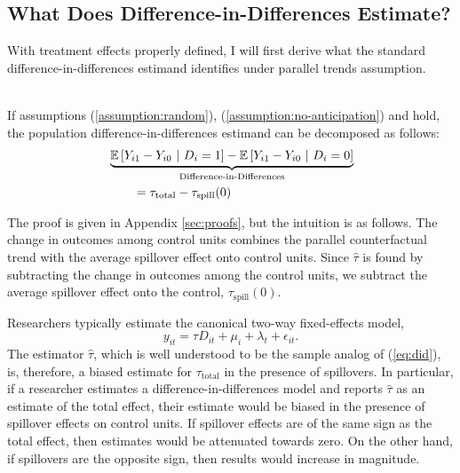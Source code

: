 \documentclass[11pt]{article}
\begin{document}
\subsection{What Does Difference-in-Differences Estimate?}

With treatment effects properly defined, I will first derive what the standard difference-in-differences estimand identifies under parallel trends assumption. 

\begin{proposition}\label{thm:bias}\ \\    
    If assumptions (\ref{assumption:random}), (\ref{assumption:no-anticipation}) and  hold, the population difference-in-differences estimand can be decomposed as follows:
    \begin{align}
        &\underbrace{\mathbb{E}\left[Y_{i1} - Y_{i0} \ \vert \ D_i = 1 \right] - \mathbb{E}\left[Y_{i1} - Y_{i0} \ \vert \ D_i = 0 \right]}_{\text{Difference-in-Differences}} \label{eq:did} \\ 
        &\quad\quad= \tau_{\text{total}} - \tau_{\text{spill}}(0)
    \end{align}
\end{proposition}

The proof is given in Appendix \ref{sec:proofs}, but the intuition is as follows. The change in outcomes among control units combines the parallel counterfactual trend with the average spillover effect onto control units. Since $\hat{\tau}$ is found by subtracting the change in outcomes among the control units, we subtract the average spillover effect onto the control, $\tau_{\text{spill}}(0)$. 

Researchers typically estimate the canonical two-way fixed-effects model, 
\begin{equation}\label{eq:twfe}    
    y_{it} = \tau D_{it} + \mu_i + \lambda_t + \epsilon_{it}.
\end{equation}
The estimator $\hat{\tau}$, which is well understood to be the sample analog of (\ref{eq:did}), is, therefore, a biased estimate for $\tau_{\text{total}}$ in the presence of spillovers. In particular, if a researcher estimates a difference-in-differences model and reports $\hat{\tau}$ as an estimate of the total effect, their estimate would be biased in the presence of spillover effects on control units. If spillover effects are of the same sign as the total effect, then estimates would be attenuated towards zero. On the other hand, if spillovers are the opposite sign, then results would increase in magnitude. 
\end{document}
